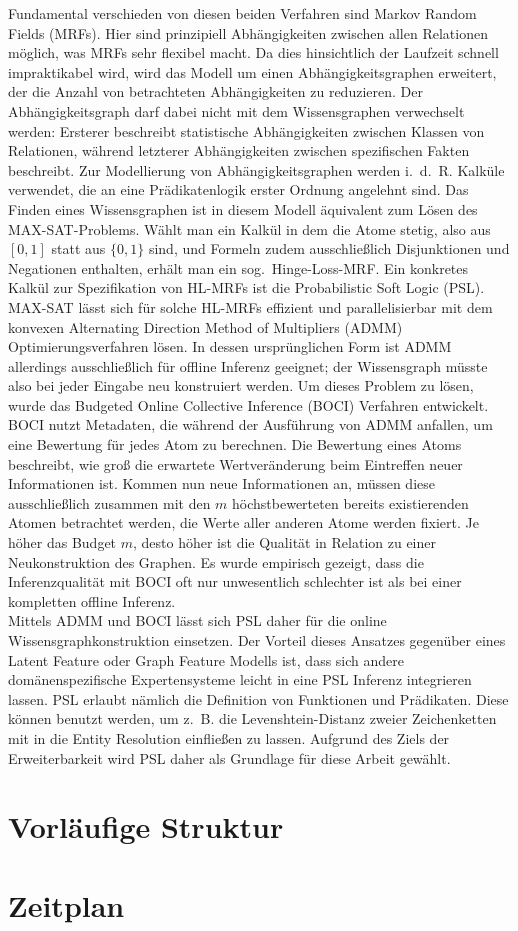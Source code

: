 \documentclass[11pt, a4paper]{scrreprt}
\begin{document}
Fundamental verschieden von diesen beiden Verfahren sind Markov Random Fields (MRFs).
Hier sind prinzipiell Abhängigkeiten zwischen allen Relationen möglich, was MRFs sehr flexibel macht.
Da dies hinsichtlich der Laufzeit schnell impraktikabel wird, wird das Modell um einen Abhängigkeitsgraphen erweitert, der die Anzahl von betrachteten Abhängigkeiten zu reduzieren.
Der Abhängigkeitsgraph darf dabei nicht mit dem Wissensgraphen verwechselt werden:
Ersterer beschreibt statistische Abhängigkeiten zwischen Klassen von Relationen, während letzterer Abhängigkeiten zwischen spezifischen Fakten beschreibt.
Zur Modellierung von Abhängigkeitsgraphen werden i.~d.~R. Kalküle verwendet, die an eine Prädikatenlogik erster Ordnung angelehnt sind.
Das Finden eines Wissensgraphen ist in diesem Modell äquivalent zum Lösen des MAX-SAT-Problems.
Wählt man ein Kalkül in dem die Atome stetig, also aus $[0, 1]$ statt aus $\{0, 1\}$ sind, und Formeln zudem ausschließlich Disjunktionen und Negationen enthalten, erhält man ein sog.\ Hinge-Loss-MRF\@.
Ein konkretes Kalkül zur Spezifikation von HL-MRFs ist die Probabilistic Soft Logic (PSL).
MAX-SAT lässt sich für solche HL-MRFs effizient und parallelisierbar mit dem konvexen Alternating Direction Method of Multipliers (ADMM) Optimierungsverfahren lösen.
In dessen ursprünglichen Form ist ADMM allerdings ausschließlich für offline Inferenz geeignet;
der Wissensgraph müsste also bei jeder Eingabe neu konstruiert werden.
Um dieses Problem zu lösen, wurde das Budgeted Online Collective Inference (BOCI) Verfahren entwickelt.
BOCI nutzt Metadaten, die während der Ausführung von ADMM anfallen, um eine Bewertung für jedes Atom zu berechnen.
Die Bewertung eines Atoms beschreibt, wie groß die erwartete Wertveränderung beim Eintreffen neuer Informationen ist.
Kommen nun neue Informationen an, müssen diese ausschließlich zusammen mit den $m$ höchstbewerteten bereits existierenden Atomen betrachtet werden, die Werte aller anderen Atome werden fixiert.
Je höher das Budget $m$, desto höher ist die Qualität in Relation zu einer Neukonstruktion des Graphen.
Es wurde empirisch gezeigt, dass die Inferenzqualität mit BOCI oft nur unwesentlich schlechter ist als bei einer kompletten offline Inferenz.\\

Mittels ADMM und BOCI lässt sich PSL daher für die online Wissensgraphkonstruktion einsetzen.
Der Vorteil dieses Ansatzes gegenüber eines Latent Feature oder Graph Feature Modells ist, dass sich andere domänenspezifische Expertensysteme leicht in eine PSL Inferenz integrieren lassen.
PSL erlaubt nämlich die Definition von Funktionen und Prädikaten.
Diese können benutzt werden, um z.~B. die Levenshtein-Distanz zweier Zeichenketten mit in die Entity Resolution einfließen zu lassen.
Aufgrund des Ziels der Erweiterbarkeit wird PSL daher als Grundlage für diese Arbeit gewählt.

\section{Vorläufige Struktur}

\section{Zeitplan}
\end{document}
